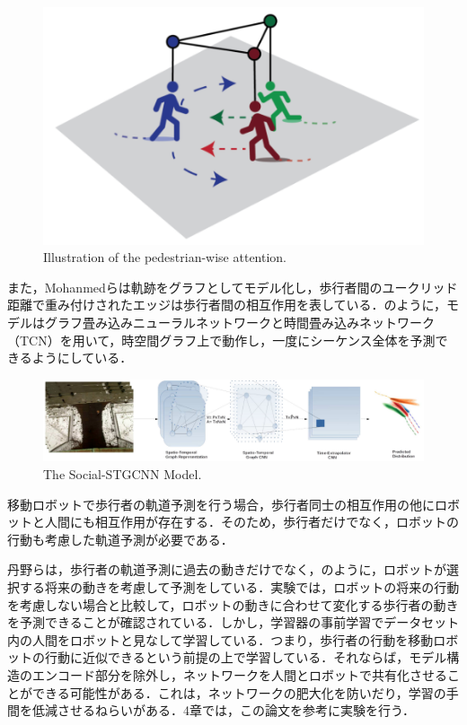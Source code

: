 \begin{figure}[hbtp]
     \centering
    \includegraphics[keepaspectratio, scale=0.4]
         {images/s-bigat.png}
    \caption{Illustration of the pedestrian-wise attention.\protect\footnotemark[3]}
    \label{Fig:s-bigat}
\end{figure}

\protect{}

また，Mohanmedら\cite{s-stgcnn}は軌跡をグラフとしてモデル化し，歩行者間のユークリッド距離で重み付けされたエッジは歩行者間の相互作用を表している．のように，モデルはグラフ畳み込みニューラルネットワークと時間畳み込みネットワーク（TCN）を用いて，時空間グラフ上で動作し，一度にシーケンス全体を予測できるようにしている．

\begin{figure}[hbtp]
     \centering
    \includegraphics[keepaspectratio, scale=0.39]
         {images/s-stgcnn.png}
    \caption{The Social-STGCNN Model.\protect\footnotemark[4]}
    \label{Fig:s-stgcnn}
\end{figure}

\protect{}

\newpage

移動ロボットで歩行者の軌道予測を行う場合，歩行者同士の相互作用の他にロボットと人間にも相互作用が存在する．そのため，歩行者だけでなく，ロボットの行動も考慮した軌道予測が必要である．

丹野ら\cite{future-robot}は，歩行者の軌道予測に過去の動きだけでなく，のように，ロボットが選択する将来の動きを考慮して予測をしている．実験では，ロボットの将来の行動を考慮しない場合と比較して，ロボットの動きに合わせて変化する歩行者の動きを予測できることが確認されている．しかし，学習器の事前学習でデータセット内の人間をロボットと見なして学習している．つまり，歩行者の行動を移動ロボットの行動に近似できるという前提の上で学習している．それならば，モデル構造のエンコード部分を除外し，ネットワークを人間とロボットで共有化させることができる可能性がある．これは，ネットワークの肥大化を防いだり，学習の手間を低減させるねらいがある．4章では，この論文を参考に実験を行う．

